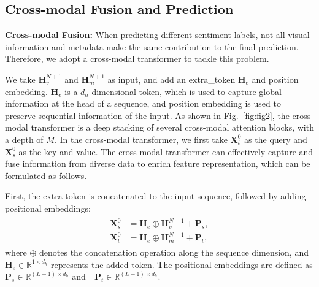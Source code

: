 % 
\subsection{Cross-modal Fusion and Prediction}
\textbf{Cross-modal Fusion:}
When predicting different sentiment labels, not all visual information and metadata make the same contribution to the final prediction. Therefore, we adopt a cross-modal transformer to tackle this problem.

We take $\bm{H}_v^{N+1}$ and $\bm{H}_m^{N+1}$ as input, and add an extra\_token $\bm{H}_e$ and position embedding.
$\bm{H}_e$ is a $d_h$-dimensional token, which is used to capture global information at the head of a sequence, and
position embedding is used to preserve sequential information of the input.
As shown in Fig.~\ref{fig:fig2}, the cross-modal transformer is a deep stacking of several cross-modal attention blocks, with a depth of $M$. In the cross-modal transformer, we first take $\bm{X}_t^0$ as the query and $\bm{X}_s^0$ as the key and value.
The cross-modal transformer can effectively capture and fuse information from diverse data to enrich feature representation, which can be formulated as follows.


First, the extra token is concatenated to the input sequence, followed by adding positional embeddings:
\begin{eqnarray}
\begin{aligned}
\bm{X}_s^0 &= \bm{H}_e \oplus \bm{H}_v^{N+1} + \bm{P}_s,\\
\bm{X}_t^0 &= \bm{H}_e \oplus \bm{H}_m^{N+1} + \bm{P}_t,
\end{aligned}
\end{eqnarray}
where \( \oplus \) denotes the concatenation operation along the sequence dimension, and \( \bm{H}_e \in \mathbb{R}^{ 1 \times d_h} \) represents the added token.
The positional embeddings are defined as $\bm{P}_s \in \mathbb{R}^{(L + 1) \times d_h}$ and$\quad \bm{P}_t \in \mathbb{R}^{(L + 1) \times d_h}$.

